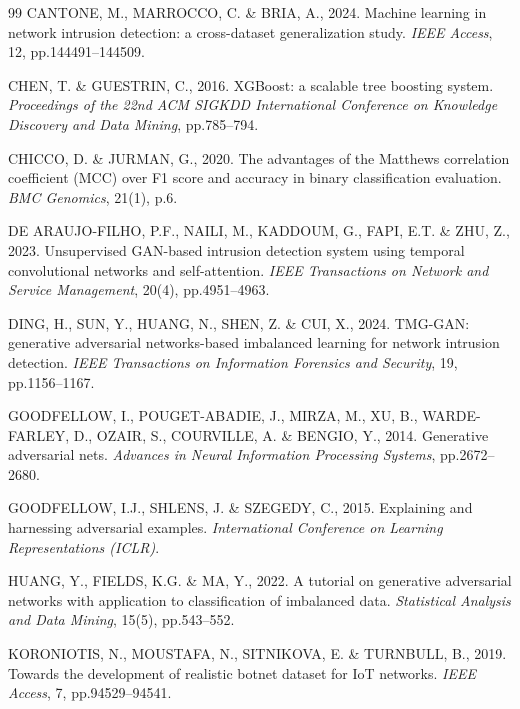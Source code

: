 \documentclass[10pt,twocolumn,a4paper]{extarticle}
\begin{document}
\begin{thebibliography}{99}
CANTONE, M., MARROCCO, C. \& BRIA, A., 2024. Machine learning in network intrusion detection: a cross-dataset generalization study. \textit{IEEE Access}, 12, pp.144491--144509.

CHEN, T. \& GUESTRIN, C., 2016. XGBoost: a scalable tree boosting system. \textit{Proceedings of the 22nd ACM SIGKDD International Conference on Knowledge Discovery and Data Mining}, pp.785--794.

CHICCO, D. \& JURMAN, G., 2020. The advantages of the Matthews correlation coefficient (MCC) over F1 score and accuracy in binary classification evaluation. \textit{BMC Genomics}, 21(1), p.6.

DE ARAUJO-FILHO, P.F., NAILI, M., KADDOUM, G., FAPI, E.T. \& ZHU, Z., 2023. Unsupervised GAN-based intrusion detection system using temporal convolutional networks and self-attention. \textit{IEEE Transactions on Network and Service Management}, 20(4), pp.4951--4963.

DING, H., SUN, Y., HUANG, N., SHEN, Z. \& CUI, X., 2024. TMG-GAN: generative adversarial networks-based imbalanced learning for network intrusion detection. \textit{IEEE Transactions on Information Forensics and Security}, 19, pp.1156--1167.


GOODFELLOW, I., POUGET-ABADIE, J., MIRZA, M., XU, B., WARDE-FARLEY, D., OZAIR, S., COURVILLE, A. \& BENGIO, Y., 2014. Generative adversarial nets. \textit{Advances in Neural Information Processing Systems}, pp.2672--2680.

GOODFELLOW, I.J., SHLENS, J. \& SZEGEDY, C., 2015. Explaining and harnessing adversarial examples. \textit{International Conference on Learning Representations (ICLR)}.

HUANG, Y., FIELDS, K.G. \& MA, Y., 2022. A tutorial on generative adversarial networks with application to classification of imbalanced data. \textit{Statistical Analysis and Data Mining}, 15(5), pp.543--552.

KORONIOTIS, N., MOUSTAFA, N., SITNIKOVA, E. \& TURNBULL, B., 2019. Towards the development of realistic botnet dataset for IoT networks. \textit{IEEE Access}, 7, pp.94529--94541.


\end{thebibliography}
\end{document}
